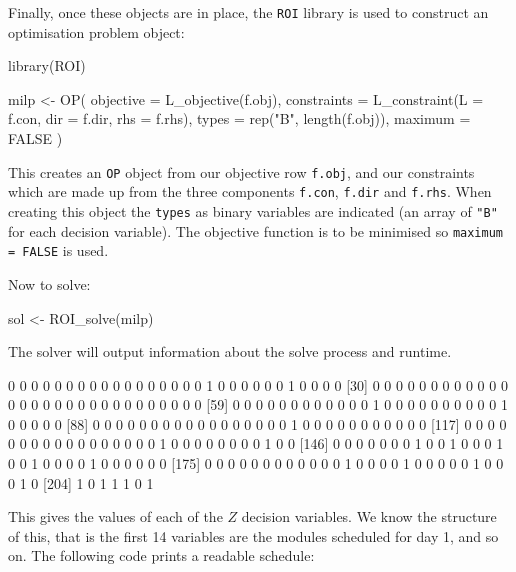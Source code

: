 Finally, once these objects are in place, the
\texttt{ROI} library is used to construct an optimisation problem object:

\begin{Rin-no-test}
library(ROI)

milp <- OP(
  objective = L_objective(f.obj),
  constraints = L_constraint(L = f.con, dir = f.dir, rhs = f.rhs),
  types = rep("B", length(f.obj)),
  maximum = FALSE
)
\end{Rin-no-test}

This creates an \texttt{OP} object from our objective row
\texttt{f.obj}, and our constraints which are made up from the three
components \texttt{f.con}, \texttt{f.dir} and
\texttt{f.rhs}.
When creating this object the \texttt{types} as binary
variables are indicated (an array of \texttt{"B"} for each decision
variable).
The objective function is to be minimised so
\texttt{maximum = FALSE} is used.

Now to solve:

\begin{Rin-no-test}
sol <- ROI_solve(milp)
\end{Rin-no-test}

The solver will output information about the solve process and runtime.


\begin{Rout-no-test}
  [1] 0 0 0 0 0 0 0 0 0 0 0 0 0 0 0 0 0 1 0 0 0 0 0 0 1 0 0 0 0
 [30] 0 0 0 0 0 0 0 0 0 0 0 0 0 0 0 0 0 0 0 0 0 0 0 0 0 0 0 0 0
 [59] 0 0 0 0 0 0 0 0 0 0 0 0 1 0 0 0 0 0 0 0 0 0 0 1 0 0 0 0 0
 [88] 0 0 0 0 0 0 0 0 0 0 0 0 0 0 0 0 0 1 0 0 0 0 0 0 0 0 0 0 0
[117] 0 0 0 0 0 0 0 0 0 0 0 0 0 0 0 0 0 1 0 0 0 0 0 0 0 0 1 0 0
[146] 0 0 0 0 0 0 0 1 0 0 1 0 0 0 1 0 0 1 0 0 0 0 1 0 0 0 0 0 0
[175] 0 0 0 0 0 0 0 0 0 0 0 0 1 0 0 0 0 1 0 0 0 0 0 1 0 0 0 1 0
[204] 1 0 1 1 1 0 1
\end{Rout-no-test}

This gives the values of each of the \(Z\) decision variables.
We know the structure of this, that is the first 14 variables are the modules
scheduled for day 1, and so on.
The following code prints a readable schedule:


